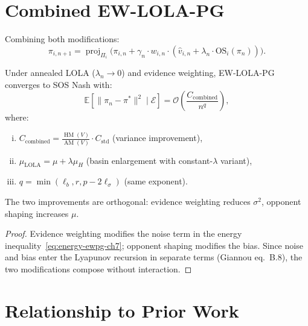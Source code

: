 \section{Combined EW-LOLA-PG}
\label{sec:combined-convergence}

Combining both modifications:
\begin{equation}
\label{eq:ew-lola-ch7}
\tag{EW-LOLA-PG}
    \pi_{i,n+1} = \operatorname{proj}_{\Pi_i}\bigl(\pi_{i,n} + \gamma_n \cdot w_{i,n} \cdot (\hat{v}_{i,n} + \lambda_n \cdot \mathrm{OS}_i(\pi_n))\bigr).
\end{equation}

\begin{theorem}
\label{thm:combined-ch7}
Under annealed LOLA ($\lambda_n \to 0$) and evidence weighting, EW-LOLA-PG converges to SOS Nash with:
\begin{equation}
    \mathbb{E}[\|\pi_n - \pi^*\|^2 \mid \mathcal{E}] = \mathcal{O}\!\left(\frac{C_{\mathrm{combined}}}{n^q}\right),
\end{equation}
where:
\begin{enumerate}[(i)]
    \item $C_{\mathrm{combined}} = \frac{\operatorname{HM}(V)}{\operatorname{AM}(V)} \cdot C_{\mathrm{std}}$ \quad (variance improvement),
    \item $\mu_{\mathrm{LOLA}} = \mu + \lambda \mu_H$ \quad (basin enlargement with constant-$\lambda$ variant),
    \item $q = \min(\ell_b, r, p - 2\ell_\sigma)$ \quad (same exponent).
\end{enumerate}
The two improvements are orthogonal: evidence weighting reduces $\sigma^2$, opponent shaping increases $\mu$.
\end{theorem}

\begin{proof}
Evidence weighting modifies the noise term in the energy inequality~\eqref{eq:energy-ewpg-ch7}; opponent shaping modifies the bias. Since noise and bias enter the Lyapunov recursion in separate terms (Giannou eq.~B.8), the two modifications compose without interaction.
\end{proof}


\section{Relationship to Prior Work}
\label{sec:relationship-ch7}

